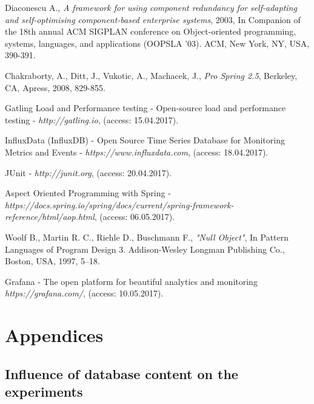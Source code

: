 \documentclass[12pt,a4paper]{article}
\begin{document}
\begin{thebibliography}{9}
Diaconescu A., \textit{A framework for using component redundancy for self-adapting and self-optimising component-based enterprise systems}, 2003, In Companion of the 18th annual ACM SIGPLAN conference on Object-oriented programming, systems, languages, and applications (OOPSLA '03). ACM, New York, NY, USA, 390-391. 

Chakraborty, A., Ditt, J., Vukotic, A., Machacek, J., \textit{Pro Spring 2.5}, Berkeley, CA, Apress, 2008, 829-855.  

Gatling Load and Performance testing - Open-source load and performance testing - \textit{http://gatling.io}, (access: 15.04.2017).

InfluxData (InfluxDB) - Open Source Time Series Database for Monitoring Metrics and Events - \textit{https://www.influxdata.com}, (access: 18.04.2017).


JUnit - \textit{http://junit.org}, (access: 20.04.2017).

Aspect Oriented Programming with Spring - \\
\textit{https://docs.spring.io/spring/docs/current/spring-framework-reference/html/aop.html}, (access: 06.05.2017).

Woolf B., Martin R. C., Riehle D., Buschmann F., \textit{"Null Object"}, In Pattern Languages of Program Design 3. Addison-Wesley Longman Publishing Co., Boston, USA, 1997, 5–18. 

Grafana - The open platform for beautiful analytics and monitoring \textit{https://grafana.com/}, (access: 10.05.2017).

\end{thebibliography}

\pagebreak
\clearpage
\section{Appendices} \label{section:appendices}

\appendix
\setcounter{table}{0}
\renewcommand{\thesubsection}{\Alph{subsection}}
\renewcommand{\thetable}{\Alph{subsection}.\numberwithin{table}{subsection}}

\subsection{Influence of database content on the experiments} \label{appendix:influencedb}
\end{document}
